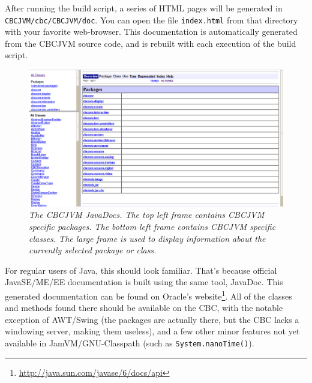 \documentclass[10pt,letterpaper]{article}
\newcommand{\urlfootnote}[1]{\footnote{\url{#1}}}
\begin{document}
After running the build script, a series of HTML pages will be generated in \texttt{CBCJVM/cbc/CBCJVM/doc}. You can open the file \texttt{index.html} from that directory with your favorite web-browser. This documentation is automatically generated from the CBCJVM source code, and is rebuilt with each execution of the build script.

\begin{figure}[h]
\includegraphics[width=\textwidth]{javadocs.png}
\caption{\textit{The CBCJVM JavaDocs. The top left frame contains CBCJVM specific packages. The bottom left frame contains CBCJVM specific classes. The large frame is used to display information about the currently selected package or class.}}
\end{figure}

For regular users of Java, this should look familiar. That's because official JavaSE/ME/EE documentation is built using the same tool, JavaDoc. This generated documentation can be found on Oracle's website\urlfootnote{http://java.sun.com/javase/6/docs/api}. All of the classes and methods found there should be available on the CBC, with the notable exception of AWT/Swing (the packages are actually there, but the CBC lacks a windowing server, making them useless), and a few other minor features not yet available in JamVM/GNU-Classpath (such as \texttt{System.nanoTime()}).
\end{document}
